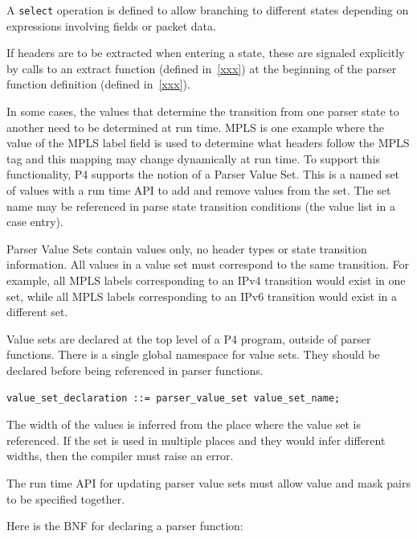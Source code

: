 \documentclass[12pt]{article}
\begin{document}
A \texttt{select} operation is defined to allow branching to different
states depending on expressions involving fields or packet data.

If headers are to be extracted when entering a state, these are
signaled explicitly by calls to an extract function (defined in~\ref{xxx}) 
at the beginning of the parser function definition (defined in~\ref{xxx}).


In some cases, the values that determine the transition from one
parser state to another need to be determined at run time. MPLS is one
example where the value of the MPLS label field is used to determine
what headers follow the MPLS tag and this mapping may change
dynamically at run time. To support this functionality, P4 supports
the notion of a Parser Value Set. This is a named set of values with a
run time API to add and remove values from the set. The set name may
be referenced in parse state transition conditions (the value list in
a case entry).

Parser Value Sets contain values only, no header types or state transition 
information. All values in a value set must correspond to the same transition. 
For example, all MPLS labels corresponding to an IPv4 transition would exist 
in one set, while all MPLS labels corresponding to an IPv6 transition would 
exist in a different set.

Value sets are declared at the top level of a P4 program, outside of parser 
functions. There is a single global namespace for value sets. They should 
be declared before being referenced in parser functions.

\begin{lstlisting}[style=BNFstyle]
value_set_declaration ::= parser_value_set value_set_name;
\end{lstlisting}

The width of the values is inferred from the place where the value set is 
referenced.  If the set is used in multiple places and they would infer
different widths, then the compiler must raise an error.

The run time API for updating parser value sets must allow value and mask
pairs to be specified together.


Here is the BNF for declaring a parser function:
\end{document}
